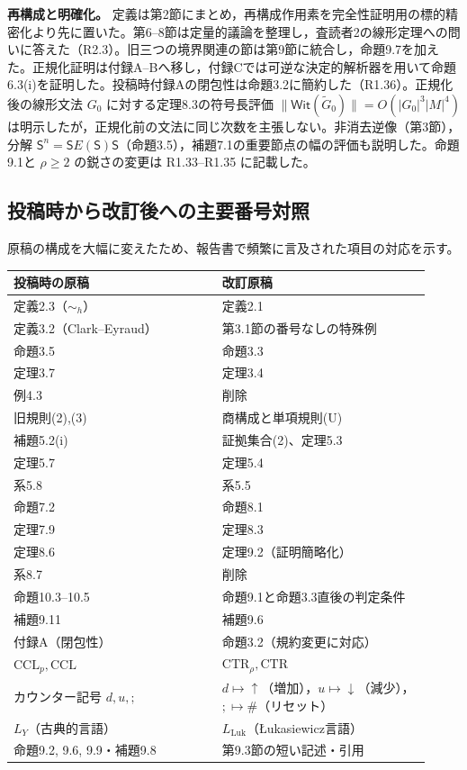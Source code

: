 \noindent\textbf{再構成と明確化。}
定義は第2節にまとめ，再構成作用素を完全性証明用の標的精密化より先に置いた。第6--8節は定量的議論を整理し，査読者2の線形定理への問いに答えた（R2.3）。旧三つの境界関連の節は第9節に統合し，命題9.7を加えた。正規化証明は付録A--Bへ移し，付録Cでは可逆な決定的解析器を用いて命題6.3(i)を証明した。投稿時付録Aの閉包性は命題3.2に簡約した（R1.36）。正規化後の線形文法 $G_0$ に対する定理8.3の符号長評価 $\|\mathsf{Wit}(\widetilde G_0)\|=O(|G_0|^3|M|^4)$ は明示したが，正規化前の文法に同じ次数を主張しない。非消去逆像（第3節），分解 $\mathsf{S}^n=\mathsf{S}E(\mathsf{S})\mathsf{S}$（命題3.5），補題7.1の重要節点の幅の評価も説明した。命題9.1と $\rho\ge2$ の鋭さの変更は R1.33--R1.35 に記載した。

\subsection*{投稿時から改訂後への主要番号対照}
原稿の構成を大幅に変えたため、報告書で頻繁に言及された項目の対応を示す。
\begin{center}\small
\begin{tabular}{@{}p{0.46\linewidth}p{0.46\linewidth}@{}}
\toprule
投稿時の原稿 & 改訂原稿\\\midrule
定義2.3（$\sim_h$）& 定義2.1\\
定義3.2（Clark--Eyraud）& 第3.1節の番号なしの特殊例\\
命題3.5 & 命題3.3\\
定理3.7 & 定理3.4\\
例4.3 & 削除\\
旧規則(2),(3) & 商構成と単項規則(U)\\
補題5.2(i) & 証拠集合(2)、定理5.3\\
定理5.7 & 定理5.4\\
系5.8 & 系5.5\\
命題7.2 & 命題8.1\\
定理7.9 & 定理8.3\\
定理8.6 & 定理9.2（証明簡略化）\\
系8.7 & 削除\\
命題10.3--10.5 & 命題9.1と命題3.3直後の判定条件\\
補題9.11 & 補題9.6\\
付録A（閉包性）& 命題3.2（規約変更に対応）\\
$\mathrm{CCL}_{p},\mathrm{CCL}$ & $\mathrm{CTR}_{\rho},\mathrm{CTR}$\\
カウンター記号 $d,u,;$ & $d\mapsto\uparrow$（増加），$u\mapsto\downarrow$（減少），$;\mapsto\#$（リセット）\\
$L_Y$（古典的言語）& $L_{\mathrm{Luk}}$（Łukasiewicz言語）\\
命題9.2, 9.6, 9.9・補題9.8 & 第9.3節の短い記述・引用\\
\bottomrule
\end{tabular}
\end{center}
